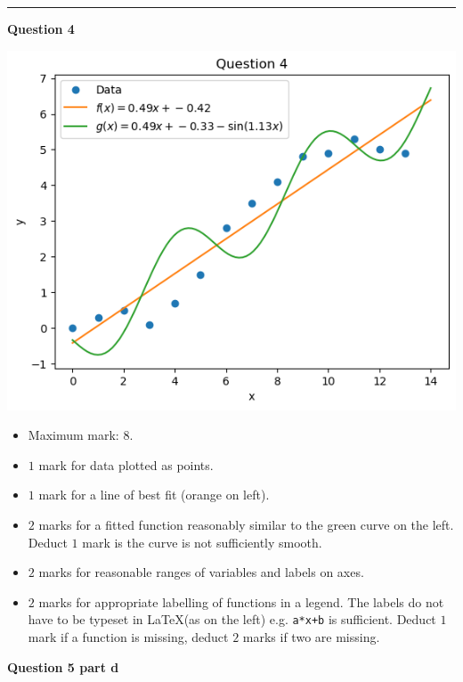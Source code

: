 \documentclass[oneside,12pt]{article}
\begin{document}
	\vspace*{15pt}
	\hrule height 1pt
		
	\noindent\textbf{Question 4}
	
	\begin{minipage}{0.49\textwidth}
		\includegraphics[scale=0.65]{q4.png}
	\end{minipage}
	\begin{minipage}{0.49\textwidth}
		\begin{itemize}
			\item Maximum mark: \(8\).
			\item \(1\) mark for data plotted as points.
			\item \(1\) mark for a line of best fit (orange on left).
			\item \(2\) marks for a fitted function reasonably similar to the green curve on the left. Deduct \(1\) mark is the curve is not sufficiently smooth.
			\item \(2\) marks for reasonable ranges of variables and labels on axes.
			\item \(2\) marks for appropriate labelling of functions in a legend. The labels do not have to be typeset in \LaTeX (as on the left) e.g. \verb|a*x+b| is sufficient. Deduct \(1\) mark if a function is missing, deduct \(2\) marks if two are missing.
		\end{itemize}
	\end{minipage}
	
	\newpage
	
	\noindent\textbf{Question 5 part d}
	
\end{document}
